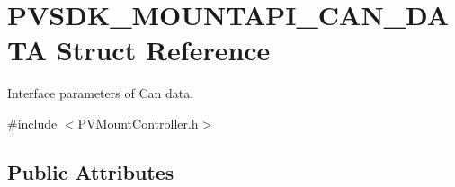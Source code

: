 \hypertarget{struct_p_v_s_d_k___m_o_u_n_t_a_p_i___c_a_n___d_a_t_a}{}\section{P\+V\+S\+D\+K\+\_\+\+M\+O\+U\+N\+T\+A\+P\+I\+\_\+\+C\+A\+N\+\_\+\+D\+A\+TA Struct Reference}
\label{struct_p_v_s_d_k___m_o_u_n_t_a_p_i___c_a_n___d_a_t_a}


Interface parameters of Can data.  




{\ttfamily \#include $<$P\+V\+Mount\+Controller.\+h$>$}

\subsection*{Public Attributes}
